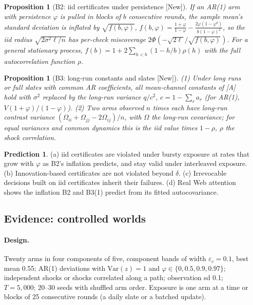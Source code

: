 \documentclass[11pt]{article}
\newtheorem{proposition}[theorem]{Proposition}
\theoremstyle{definition}
\newtheorem{prediction}{Prediction}
\theoremstyle{remark}
\newcommand{\Var}{\mathrm{Var}}
\newcommand{\src}[1]{\textsf{[#1]}}
\begin{document}
\begin{proposition}[B2: iid certificates under persistence \src{New}]\label{prop:b2}
If an AR(1) arm with persistence $\varphi$ is pulled in blocks of $b$ consecutive rounds, the sample mean's standard deviation is inflated by $\sqrt{f(b,\varphi)}$, $f(b,\varphi)=\frac{1+\varphi}{1-\varphi}-\frac{2\varphi(1-\varphi^b)}{b(1-\varphi)^2}$, so the iid radius $\sqrt{2\sigma^2\ell/n}$ has per-check miscoverage $2\Phi(-\sqrt{2\ell}/\sqrt{f(b,\varphi)})$. For a general stationary process, $f(b)=1+2\sum_{h<b}(1-h/b)\rho(h)$ with the full autocorrelation function $\rho$.
\end{proposition}

\begin{proposition}[B3: long-run constants and slates \src{New}]\label{prop:b3}
(1) Under long runs or full slates with common AR coefficients, all mean-channel constants of \src{A} hold with $\sigma^2$ replaced by the long-run variance $q/c^2$, $c=1-\sum_ra_r$ (for AR(1), $V(1+\varphi)/(1-\varphi)$). (2) Two arms observed $n$ times each have long-run contrast variance $(\Omega_{ii}+\Omega_{jj}-2\Omega_{ij})/n$, with $\Omega$ the long-run covariance; for equal variances and common dynamics this is the iid value times $1-\rho$, $\rho$ the shock correlation.
\end{proposition}

\begin{prediction}\label{pred:q3}
(a) iid certificates are violated under bursty exposure at rates that grow with $\varphi$ as B2's inflation predicts, and stay valid under interleaved exposure. (b) Innovation-based certificates are not violated beyond $\delta$. (c) Irrevocable decisions built on iid certificates inherit their failures. (d) Real Web attention shows the inflation B2 and B3(1) predict from its fitted autocovariance.
\end{prediction}

\subsection{Evidence: controlled worlds}

\paragraph{Design.} Twenty arms in four components of five, component bands of width $\varepsilon_c=0.1$, best mean 0.55; AR(1) deviations with $\Var(z)=1$ and $\varphi\in\{0,0.5,0.9,0.97\}$; independent shocks or shocks correlated along a path; observation sd 0.1; $T=5{,}000$; 20--30 seeds with shuffled arm order. Exposure is one arm at a time or blocks of 25 consecutive rounds (a daily slate or a batched update).
\end{document}
